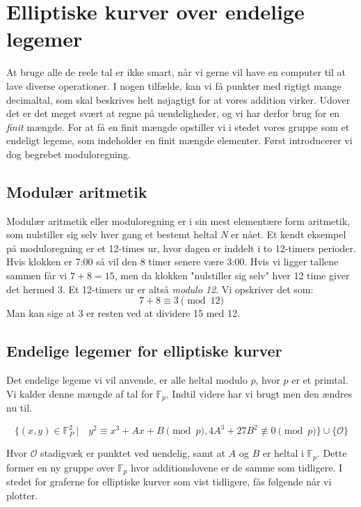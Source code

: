 \section{Elliptiske kurver over endelige legemer}
At bruge alle de reele tal er ikke smart, når vi gerne vil have en computer til at lave diverse operationer. I nogen tilfælde, kan vi få punkter med rigtigt mange decimaltal, som skal beskrives helt nøjagtigt for at vores addition virker. Udover det er det meget svært at regne på uendeligheder, og vi har derfor brug for en \textit{finit} mængde. For at få en finit mængde opstiller vi i stedet vores gruppe som et endeligt legeme, som indeholder en finit mængde elementer. Først introducerer vi dog begrebet moduloregning.

\subsection{Modulær aritmetik}
Modulær aritmetik eller moduloregning er i sin mest elementære form aritmetik, som nulstiller sig selv hver gang et bestemt heltal \textit{N} er nået. Et kendt eksempel på moduloregning er et 12-times ur, hvor dagen er inddelt i to 12-timers perioder. Hvis klokken er 7:00 så vil den $8$ timer senere være 3:00. Hvis vi ligger tallene sammen får vi $7+8=15$, men da klokken "nulstiller sig selv" hver 12 time giver det hermed $3$. Et 12-timers ur er altså \textit{modulo 12}. Vi opskriver det som:
$$7+8 \equiv 3 \pmod{12}$$
Man kan sige at 3 er resten ved at dividere 15 med 12.

\subsection{Endelige legemer for elliptiske kurver}
Det endelige legeme vi vil anvende, er alle heltal modulo $p$, hvor $p$ er et primtal. Vi kalder denne mængde af tal for $\mathbb{F}_p$. Indtil videre har vi brugt  men den ændres nu til.

\begin{mdframed}[frametitle={Endeligt legeme for elliptisk kurve}]
\begin{equation}\label{eq:ecc_finite}
    \{(x,y) \in \mathbb{F}_{P}^2\ | \quad y^2 \equiv x^3+Ax+B \pmod{p}, 4A^3 + 27B^2 \not\equiv 0 \pmod{p} \} \cup \{\mathcal{O}\}
\end{equation}
\end{mdframed}

Hvor $\mathcal{O}$ stadigvæk er punktet ved uendelig, samt at $A$ og $B$ er heltal i $\mathbb{F}_{p}$. Dette former en ny gruppe over $\mathbb{F}_p$ hvor additionslovene er de samme som tidligere. I stedet for graferne for elliptiske kurver som vist tidligere, fås følgende når vi plotter.

